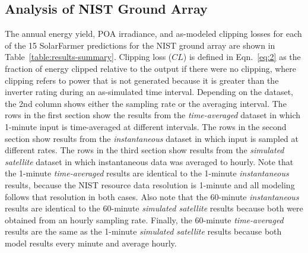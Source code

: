 \documentclass[conference]{IEEEtran}
\begin{document}
\subsection{Analysis of NIST Ground Array}
The annual energy yield, POA irradiance, and as-modeled clipping losses for each of the 15 SolarFarmer predictions for the NIST ground array are shown in Table~\ref{table:results-summary}. Clipping loss ($\mathit{CL}$) is defined in Eqn.~\ref{eq:2} as the fraction of energy clipped relative to the output if there were no clipping, where clipping refers to power that is not generated because it is greater than the inverter rating during an as-simulated time interval. Depending on the dataset, the 2nd column shows either the sampling rate or the averaging interval. The rows in the first section show the results from the \emph{time-averaged} dataset in which 1-minute input is time-averaged at different intervals. The rows in the second section show results from the \emph{instantaneous} dataset in which input is sampled at different rates. The rows in the third section show results from the \emph{simulated satellite} dataset in which instantaneous data was averaged to hourly. Note that the 1-minute \emph{time-averaged} results are identical to the 1-minute \emph{instantaneous} results, because the NIST resource data resolution is 1-minute and all modeling follows that resolution in both cases. Also note that the 60-minute \emph{instantaneous} results are identical to the 60-minute \emph{simulated satellite} results because both were obtained from an hourly sampling rate. Finally, the 60-minute \emph{time-averaged} results are the same as the 1-minute \emph{simulated satellite} results because both model results every minute and average hourly.
\end{document}

